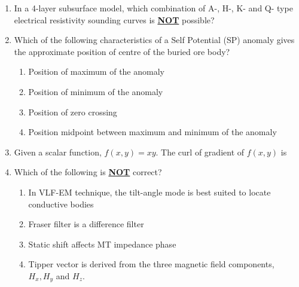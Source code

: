 \documentclass[journal,12pt,onecolumn]{IEEEtran}
\theoremstyle{remark}
\begin{document}
\begin{enumerate}[start = 26 ]
        \item In a 4-layer subsurface model, which combination of A-, H-, K- and Q- type electrical resistivity sounding curves is \underline{\textbf{NOT}} possible? \hfill{}
            \begin{enumerate}
            \end{enumerate}

        \item Which of the following characteristics of a Self Potential (SP) anomaly gives the approximate 
        position of centre of the buried ore body? \hfill{}
            \begin{enumerate}
                \item Position of maximum of the anomaly
                \item Position of minimum of the anomaly
                \item Position of zero crossing
                \item Position midpoint between maximum and minimum of the anomaly
            \end{enumerate}

        \item Given a scalar function, $f(x,y) = xy$. The curl of gradient of $f(x,y)$ is \hfill{}
            \begin{enumerate}
            \end{enumerate}

        \item Which of the following is \underline{\textbf{NOT}} correct? \hfill{}
            \begin{enumerate}
                \item In VLF-EM technique, the tilt-angle mode is best suited to locate conductive bodies
                \item Fraser filter is a difference filter
                \item Static shift affects MT impedance phase
                \item Tipper vector is derived from the three magnetic field components, $H_x, H_y$ and $H_z$.
            \end{enumerate}
        

\end{enumerate}
\end{document}
